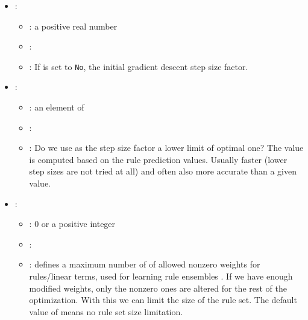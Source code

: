\begin{itemize}
\begin{itemize}
           \end{itemize}
    \item {}:
           \begin{itemize}
                \item \optionPossibleValues{}: a positive real number
                \item \optionDefaultValue{}: 
                \item \optionDescrption{}:  If  is set to \texttt{No}, the initial gradient descent step size factor.
           \end{itemize}
    \item {}:
           \begin{itemize}
                \item \optionPossibleValues{}: an element of 
                \item \optionDefaultValue{}: 
                \item \optionDescrption{}: Do we use as the step size factor a lower limit of optimal one? The value is computed based on the rule prediction values.
                Usually faster (lower step sizes are not tried at all) and often also more accurate than a given value.
           \end{itemize}
    \item {}:
           \begin{itemize}
                \item \optionPossibleValues{}: 0 or a positive integer
                \item \optionDefaultValue{}: 
                \item \optionDescrption{}: defines a maximum number of of allowed nonzero weights for
                rules/linear terms, used for learning rule ensembles \cite{Aho2009}.
                If we have enough modified weights, only the nonzero ones are altered for the rest of the optimization.
                With this we can limit the size of the rule set. The default value of  means no rule set size limitation.
           \end{itemize}
\end{itemize}
